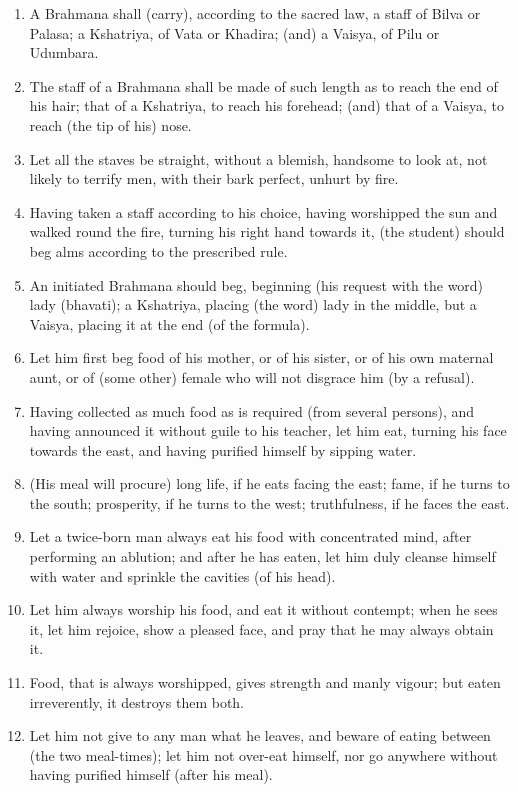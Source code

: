\begin{enumerate}
\item A Brahmana shall (carry), according to the sacred law, a staff of Bilva or Palasa; a Kshatriya, of Vata or Khadira; (and) a Vaisya, of Pilu or Udumbara.
\item The staff of a Brahmana shall be made of such length as to reach the end of his hair; that of a Kshatriya, to reach his forehead; (and) that of a Vaisya, to reach (the tip of his) nose.
\item Let all the staves be straight, without a blemish, handsome to look at, not likely to terrify men, with their bark perfect, unhurt by fire.
\item Having taken a staff according to his choice, having worshipped the sun and walked round the fire, turning his right hand towards it, (the student) should beg alms according to the prescribed rule.
\item An initiated Brahmana should beg, beginning (his request with the word) lady (bhavati); a Kshatriya, placing (the word) lady in the middle, but a Vaisya, placing it at the end (of the formula).
\item Let him first beg food of his mother, or of his sister, or of his own maternal aunt, or of (some other) female who will not disgrace him (by a refusal).
\item Having collected as much food as is required (from several persons), and having announced it without guile to his teacher, let him eat, turning his face towards the east, and having purified himself by sipping water.
\item (His meal will procure) long life, if he eats facing the east; fame, if he turns to the south; prosperity, if he turns to the west; truthfulness, if he faces the east.
\item Let a twice-born man always eat his food with concentrated mind, after performing an ablution; and after he has eaten, let him duly cleanse himself with water and sprinkle the cavities (of his head).
\item Let him always worship his food, and eat it without contempt; when he sees it, let him rejoice, show a pleased face, and pray that he may always obtain it.
\item Food, that is always worshipped, gives strength and manly vigour; but eaten irreverently, it destroys them both.
\item Let him not give to any man what he leaves, and beware of eating between (the two meal-times); let him not over-eat himself, nor go anywhere without having purified himself (after his meal).

\end{enumerate}
